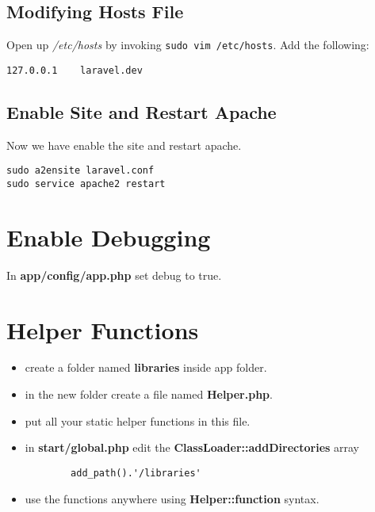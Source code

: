 \documentclass[a4paper, 12pt]{article}
\begin{document}
\subsection{Modifying Hosts File}
Open up \emph{/etc/hosts} by invoking \verb|sudo vim /etc/hosts|.
Add the following:
\begin{verbatim}
127.0.0.1    laravel.dev
\end{verbatim}
\subsection{Enable Site and Restart Apache}
Now we have enable the site and restart apache.
\begin{verbatim}
sudo a2ensite laravel.conf
sudo service apache2 restart
\end{verbatim}

\section{Enable Debugging}
In \textbf{app/config/app.php} set debug to true.

\section{Helper Functions}
\begin{itemize}
	\item create a folder named \textbf{libraries} inside app folder.
	\item in the new folder create a file named \textbf{Helper.php}.
	\item put all your static helper functions in this file.
	\item in \textbf{start/global.php} edit the \textbf{ClassLoader::addDirectories} array
		\begin{verbatim}
		add_path().'/libraries'
		\end{verbatim}
	\item use the functions anywhere using \textbf{Helper::function} syntax.
\end{itemize}
\end{document}
